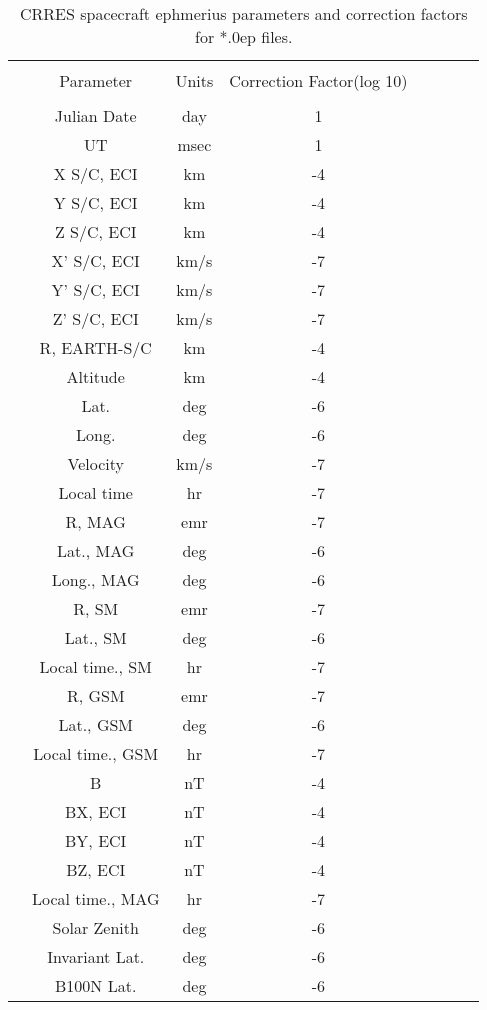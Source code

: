 \begin{table}
\footnotesize
\tiny
\begin{center}
\caption{\footnotesize CRRES spacecraft ephmerius parameters and correction factors for *.0ep files.}
\begin{tabular}{lccccccc}  
\hline
 &\\
 & Parameter		& Units		& Correction Factor(log 10)\\ 
 &\\ 
\hline
 & Julian Date 		&day			&1\\   
 & UT 			&msec 		&1\\ 
 & X S/C, ECI 		&km		    	&-4\\
 & Y S/C, ECI 		&km			&-4\\
 & Z S/C, ECI 		&km			&-4\\
 &X' S/C, ECI 		&km/s	      	&-7\\
 &Y' S/C, ECI 		&km/s	  	      &-7\\
 &Z' S/C, ECI 		&km/s 		&-7\\   
 &R, EARTH-S/C  		&km			&-4\\ 
 &Altitude  		&km			&-4\\ 
 &Lat. 	   		&deg  		&-6\\
 &Long. 	   		&deg  		&-6\\
 &Velocity 			&km/s 		&-7\\
 &Local time 		&hr			&-7\\
 &R, MAG 			&emr  		&-7\\
 &Lat., MAG	   		&deg  		&-6\\
 &Long., MAG   		&deg  		&-6\\
 &R, SM 			&emr  		&-7\\
 &Lat., SM	   		&deg  		&-6\\
 &Local time., SM		&hr			&-7\\
 &R, GSM 			&emr  		&-7\\
 &Lat., GSM	   		&deg  		&-6\\
 &Local time., GSM	&hr			&-7\\
 &B 				&nT			&-4\\ 
 &BX, ECI			&nT			&-4\\ 
 &BY, ECI			&nT			&-4\\ 
 &BZ, ECI			&nT			&-4\\
 &Local time., MAG	&hr			&-7\\
 &Solar Zenith  		&deg			&-6\\
 &Invariant Lat. 		&deg			&-6\\
 &B100N Lat.		&deg			&-6\\

\end{tabular}
\end{center}
\end{table}
